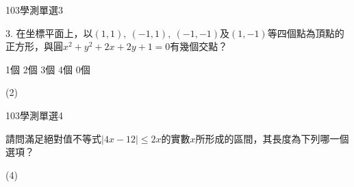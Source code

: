     \begin{QUESTION}
        \begin{ExamInfo}{103}{學測}{單選}{3}
        \end{ExamInfo}
        \begin{ExamAnsRateInfo}{73}{96}{86}{37}
        \end{ExamAnsRateInfo}
        \begin{QBODY}
            3.	在坐標平面上，以$(1,1),\ (-1,1),\ (-1,-1)$及$(1,-1)$等四個點為頂點的正方形，與圓${{x}^{2}}+{{y}^{2}}+2x+2y+1=0$有幾個交點？
			\begin{QOPS}
				\QOP 1個
				\QOP 2個
				\QOP 3個
				\QOP 4個
				\QOP 0個
			\end{QOPS}
        \end{QBODY}
        \begin{QFROMS}
        \end{QFROMS}
        \begin{QTAGS}\end{QTAGS}
        \begin{QANS}
            (2)
        \end{QANS}
        \begin{QSOLLIST}
        \end{QSOLLIST}
        \begin{QEMPTYSPACE}
        \end{QEMPTYSPACE}
    \end{QUESTION}
    \begin{QUESTION}
        \begin{ExamInfo}{103}{學測}{單選}{4}
        \end{ExamInfo}
        \begin{ExamAnsRateInfo}{68}{95}{79}{30}
        \end{ExamAnsRateInfo}
        \begin{QBODY}
            請問滿足絕對值不等式$\left| 4x-12 \right|\le 2x$的實數$x$所形成的區間，其長度為下列哪一個選項？
			\begin{QOPS}
				\QOP 1
				\QOP 2
				\QOP 3
				\QOP 4
				\QOP 6
			\end{QOPS}
        \end{QBODY}
        \begin{QFROMS}
        \end{QFROMS}
        \begin{QTAGS}\end{QTAGS}
        \begin{QANS}
            (4)
        \end{QANS}
        \begin{QSOLLIST}
        \end{QSOLLIST}
        \begin{QEMPTYSPACE}
        \end{QEMPTYSPACE}
    \end{QUESTION}

